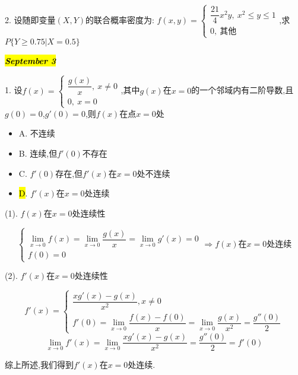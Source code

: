 2. 设随即变量$(X,Y)$的联合概率密度为:  $f(x,y)=\left\lbrace
\begin{array}{l}
	\dfrac{21}{4}x^2y,\ x^2\leq y\leq 1\\
	0,\ \text{其他}
\end{array}
\right. $,求$P\{Y\geq 0.75|X=0.5\}$
\begin{solution}
	
\end{solution}

\hl{\textbf{\textit{September 3}}}

1. 设$f(x)=\left\lbrace
\begin{array}{l}
	\dfrac{g(x)}{x},\ x\neq 0\\
	0,\ x=0
\end{array}
\right. $,其中$g(x)$在$x=0$的一个邻域内有二阶导数,且$g(0)=0$,$g'(0)=0$,则$f(x)$在点$x=0$处
\begin{itemize}
	\item A. 不连续
	\item B. 连续,但$f'(0)$不存在
	\item C. $f'(0)$存在,但$f'(x)$在$x=0$处不连续
	\item \hl{D}. $f'(x)$在$x=0$处连续
\end{itemize}
\begin{solution}

	(1). $f(x)$在$x=0$处连续性
	
	$$\left\lbrace
	\begin{array}{l}
		\lim\limits_{x\rightarrow 0}f(x)=\lim\limits_{x\rightarrow 0}\dfrac{g(x)}{x}=\lim\limits_{x\rightarrow 0}g'(x)=0\\
		f(0)=0
	\end{array}
	\right. \Rightarrow f(x)\text{在}x=0\text{处连续}$$
	
	(2). $f'(x)$在$x=0$处连续性
	
	$$f'(x)=\left\lbrace
	\begin{array}{l}
		\dfrac{xg'(x)-g(x)}{x^2},x\neq 0\\
		f'(0)=\lim\limits_{x\rightarrow 0}\dfrac{f(x)-f(0)}{x}=\lim\limits_{x\rightarrow 0}\dfrac{g(x)}{x^2}=\dfrac{g''(0)}{2}
	\end{array}
	\right.$$
	$$\lim\limits_{x\rightarrow 0}f'(x)=\lim\limits_{x\rightarrow 0}\dfrac{xg'(x)-g(x)}{x^2}=\dfrac{g''(0)}{2}=f'(0)$$
	
	综上所述,我们得到$f'(x)$在$x=0$处连续.
\end{solution}

